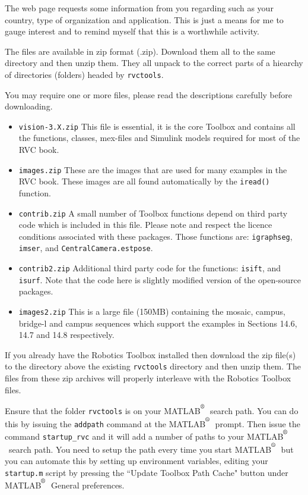 \documentclass[a4paper]{report}
\def\Mlab{MATLAB$^{\textsuperscript{\textregistered}}$}
\begin{document}
The web page requests some information from you
regarding such as your country, type of organization and application.
This is just a means for me to gauge interest and to remind myself
that this is a worthwhile activity.

The files are available in zip format (.zip).  Download them all to
the same directory and then unzip them.  They
all unpack to the correct parts of a hiearchy of directories (folders)
headed by \texttt{rvctools}.

You may require one or more files, please read the descriptions carefully
before downloading.
\begin{itemize}
\item \texttt{vision-3.X.zip} This file is essential, it is the core Toolbox and contains
all the functions, classes, mex-files and Simulink models required 
for most of the RVC book.
\item \texttt{images.zip} These are the images that are used for
many examples in the RVC book.  These images are all found automatically
by the \texttt{iread()} function.
\item \texttt{contrib.zip} A small number of Toolbox functions depend on third party code which is included in this file. Please note and respect the licence conditions associated with these packages.
Those functions are: 
\texttt{igraphseg},
\texttt{imser}, and
\texttt{CentralCamera.estpose}.
\item \texttt{contrib2.zip} Additional third party code for
the functions: \texttt{isift}, and \texttt{isurf}.
Note that the code here is slightly modified version of the open-source
packages.
\item \texttt{images2.zip} This is a large file (150MB) containing the mosaic, campus, bridge-l and campus sequences which support the examples in Sections 14.6, 14.7 and 14.8 respectively.
\end{itemize}

If you already have the Robotics Toolbox installed then download
the zip file(s) to the directory above the existing \texttt{rvctools} directory
and then unzip them.
The files from these zip archives will properly interleave with the Robotics
Toolbox files.

Ensure that the folder \texttt{rvctools} is on your \Mlab\ search
path.  You can do this by issuing the \texttt{addpath} command at 
the \Mlab\ prompt.
Then issue the command \texttt{startup\_rvc} and it will add a number
of paths to your \Mlab\ search path.
You need to setup the path every time you start \Mlab\ but you can 
automate this by setting up environment variables, editing your 
\texttt{startup.m} script by pressing the ``Update Toolbox Path
Cache" button under \Mlab\ General preferences.
\end{document}
